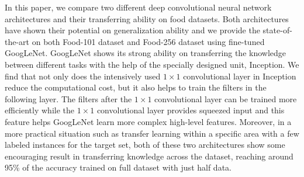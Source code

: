 In this paper, we compare two different deep convolutional neural network architectures and their transferring ability on food datasets. Both architectures have shown their potential on generalization ability and we provide the state-of-the-art on both Food-101 dataset and Food-256 dataset using fine-tuned GoogLeNet. GoogLeNet shows its strong ability on transferring the knowledge between different tasks with the help of the specially designed unit, Inception.
We find that not only does the intensively used $1\times 1$ convolutional layer in Inception reduce the computational cost, but it also helps to train the filters in the following layer. The filters after the $1\times 1$ convolutional layer can be trained more efficiently while the $1\times 1$ convolutional layer provides squeezed input and this feature helps GoogLeNet learn more complex high-level features.
Moreover, in a more practical situation such as transfer learning within a specific area with a few labeled instances for the target set, both of these two architectures show some encouraging result in transferring knowledge across the dataset, reaching around 95\% of the accuracy trained on full dataset with just half data.

